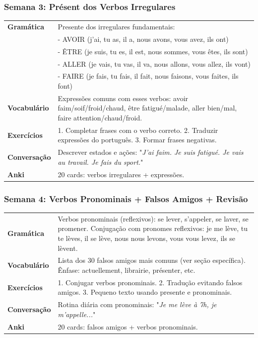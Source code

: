 \documentclass[a4paper,12pt]{article}
\begin{document}
\subsubsection*{Semana 3: Présent dos Verbos Irregulares}
\begin{tabularx}{\linewidth}{>{\bfseries}l L}
    Gramática & Presente dos irregulares fundamentais: \\
    & - AVOIR (j'ai, tu as, il a, nous avons, vous avez, ils ont) \\
    & - ÊTRE (je suis, tu es, il est, nous sommes, vous êtes, ils sont) \\
    & - ALLER (je vais, tu vas, il va, nous allons, vous allez, ils vont) \\
    & - FAIRE (je fais, tu fais, il fait, nous faisons, vous faites, ils font) \\
    Vocabulário & Expressões comuns com esses verbos: avoir faim/soif/froid/chaud, être fatigué/malade, aller bien/mal, faire attention/chaud/froid. \\
    Exercícios & 1. Completar frases com o verbo correto. 2. Traduzir expressões do português. 3. Formar frases negativas. \\
    Conversação & Descrever estados e ações: "\emph{J'ai faim. Je suis fatigué. Je vais au travail. Je fais du sport.}" \\
    Anki & 20 cards: verbos irregulares + expressões. \\
\end{tabularx}

\subsubsection*{Semana 4: Verbos Pronominais + Falsos Amigos + Revisão}
\begin{tabularx}{\linewidth}{>{\bfseries}l L}
    Gramática & Verbos pronominais (reflexivos): se lever, s'appeler, se laver, se promener. Conjugação com pronomes reflexivos: je me lève, tu te lèves, il se lève, nous nous levons, vous vous levez, ils se lèvent. \\
    Vocabulário & Lista dos 30 falsos amigos mais comuns (ver seção específica). Ênfase: actuellement, librairie, présenter, etc. \\
    Exercícios & 1. Conjugar verbos pronominais. 2. Tradução evitando falsos amigos. 3. Pequeno texto usando presente e pronominais. \\
    Conversação & Rotina diária com pronominais: "\emph{Je me lève à 7h, je m'appelle...}" \\
    Anki & 20 cards: falsos amigos + verbos pronominais. \\
\end{tabularx}
\end{document}
